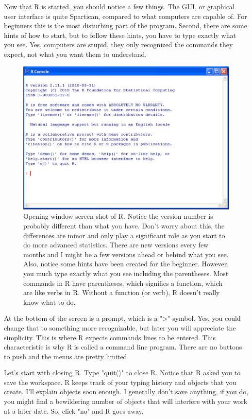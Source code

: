 \documentclass{tufte-handout}\usepackage[]{graphicx}\usepackage[]{xcolor}
\begin{document}
Now that R is started, you should notice a few things.  The GUI, or graphical user interface is quite Spartican, compared to what computers are capable of. For beginners this is the most disturbing part of the program. Second, there are some hints of how to start, but to follow these hints, you have to type exactly what you see. Yes, computers are stupid, they only recognized the commands they expect, not what you want them to understand. 

\begin{figure}
		\includegraphics{OpeningScreenShot.pdf}
	\caption{Opening window screen shot of R. Notice the version number is probably different than what you have. Don't worry about this, the differences are minor and only play a significant role as you start to do more advanced statistics. There are new versions every few months and I might be a few versions ahead or behind what you see. Also, notice some hints have been created for the beginner. However, you much type exactly what you see including the parentheses. Most commands in R have parentheses, which signifies a function, which are like verbs in R. Without a function (or verb), R doesn't really know what to do.}
	\label{fig:OpeningScreenShot}
\end{figure}

At the bottom of the screen is a prompt, which is a ">" symbol. Yes, you could change that to something more recognizable, but later you will appreciate the simplicity. This is where R expects commands lines to be entered. This characteristic is why R is called a command line program. There are no buttons to push and the menus are pretty limited.
  
Let's start with closing R.  Type "quit()" to close R. Notice that R asked you to save the workspace. R keeps track of your typing history and objects that you create. I'll explain objects soon enough. I generally don't save anything, if you do, you might find a bewildering number of objects that will interfere with your work at a later date. So, click "no" and R goes away.
\end{document}
